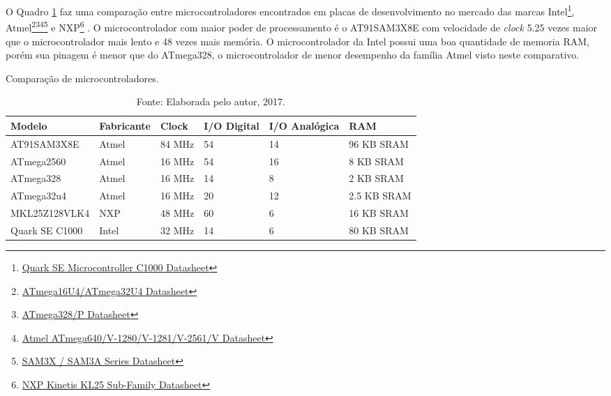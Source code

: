 O Quadro \ref{tab:microcontroladores} faz uma comparação entre microcontroladores encontrados em placas de desenvolvimento no mercado das marcas Intel\footnote{\href{https://www.intel.com/content/dam/www/public/us/en/documents/datasheets/quark-c1000-datasheet.pdf}{Quark SE Microcontroller C1000 Datasheet}}, Atmel\footnote{\href{http://www.atmel.com/Images/Atmel-7766-8-bit-AVR-ATmega16U4-32U4_Datasheet.pdf}{ATmega16U4/ATmega32U4 Datasheet}}\footnote{\href{http://www.atmel.com/Images/Atmel-42735-8-bit-AVR-Microcontroller-ATmega328-328P_Datasheet.pdf}{ATmega328/P Datasheet}}\footnote{\href{http://www.atmel.com/Images/Atmel-2549-8-bit-AVR-Microcontroller-ATmega640-1280-1281-2560-2561_datasheet.pdf}{Atmel ATmega640/V-1280/V-1281/V-2561/V Datasheet}}\footnote{\href{http://www.atmel.com/Images/Atmel-11057-32-bit-Cortex-M3-Microcontroller-SAM3X-SAM3A_Datasheet.pdf}{SAM3X / SAM3A Series Datasheet}} e NXP\footnote{\href{https://www.nxp.com/docs/en/data-sheet/KL25P80M48SF0.pdf}{NXP Kinetis KL25 Sub-Family Datasheet}} . 
O microcontrolador com maior poder de processamento é o AT91SAM3X8E com velocidade de \textit{clock} 5.25 vezes maior que o microcontrolador mais lento e 48 vezes mais memória. O microcontrolador da Intel possui uma boa quantidade de memoria RAM, porém sua pinagem é menor que do ATmega328, o microcontrolador de menor desempenho da família Atmel visto neste comparativo. 
\begin{table}[!htb]
	\centering
	\caption{Comparação de microcontroladores.}
	\label{tab:microcontroladores}
	\begin{tabular}{|l|l|l|l|l|l|}
		\hline
		\rowcolor[HTML]{9B9B9B} 
		\textbf{Modelo}  & \textbf{Fabricante} & \textbf{Clock} & \textbf{I/O Digital} & \textbf{I/O Analógica} & \textbf{RAM} \\ \hline
		AT91SAM3X8E    & Atmel               & 84 MHz         & 54                   & 14                     & 96 KB SRAM   \\ \hline
		ATmega2560     & Atmel               & 16 MHz          & 54                   & 16                     & 8 KB SRAM    \\ \hline
		ATmega328     & Atmel               & 16 MHz         & 14                   & 8                      & 2 KB SRAM    \\ \hline
		ATmega32u4     & Atmel               & 16 MHz          & 20                   & 12                     & 2.5 KB SRAM  \\ \hline
		MKL25Z128VLK4  & NXP                 & 48 MHz          & 60                   & 6                      & 16 KB SRAM   \\ \hline
		Quark SE C1000 & Intel               & 32 MHz         & 14                   & 6                      & 80 KB SRAM   \\ \hline
		\end{tabular}
	\caption*{Fonte: Elaborada pelo autor, 2017.}
\end{table}

